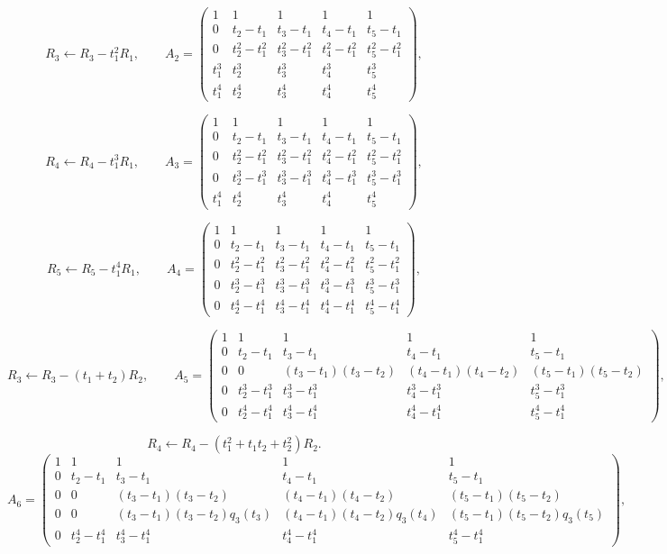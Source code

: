 \documentclass[10pt]{extarticle}
\begin{document}
\[
R_3\leftarrow R_3-t_1^2R_1,
\qquad
A_2=
\begin{pmatrix}
1 & 1 & 1 & 1 & 1\\
0 & t_2-t_1 & t_3-t_1 & t_4-t_1 & t_5-t_1\\
0 & t_2^2-t_1^2 & t_3^2-t_1^2 & t_4^2-t_1^2 & t_5^2-t_1^2\\
t_1^3 & t_2^3 & t_3^3 & t_4^3 & t_5^3\\
t_1^4 & t_2^4 & t_3^4 & t_4^4 & t_5^4
\end{pmatrix},
\]

\[
R_4\leftarrow R_4-t_1^3R_1,
\qquad
A_3=
\begin{pmatrix}
1 & 1 & 1 & 1 & 1\\
0 & t_2-t_1 & t_3-t_1 & t_4-t_1 & t_5-t_1\\
0 & t_2^2-t_1^2 & t_3^2-t_1^2 & t_4^2-t_1^2 & t_5^2-t_1^2\\
0 & t_2^3-t_1^3 & t_3^3-t_1^3 & t_4^3-t_1^3 & t_5^3-t_1^3\\
t_1^4 & t_2^4 & t_3^4 & t_4^4 & t_5^4
\end{pmatrix},
\]

\[
R_5\leftarrow R_5-t_1^4R_1,
\qquad
A_4=
\begin{pmatrix}
1 & 1 & 1 & 1 & 1\\
0 & t_2-t_1 & t_3-t_1 & t_4-t_1 & t_5-t_1\\
0 & t_2^2-t_1^2 & t_3^2-t_1^2 & t_4^2-t_1^2 & t_5^2-t_1^2\\
0 & t_2^3-t_1^3 & t_3^3-t_1^3 & t_4^3-t_1^3 & t_5^3-t_1^3\\
0 & t_2^4-t_1^4 & t_3^4-t_1^4 & t_4^4-t_1^4 & t_5^4-t_1^4
\end{pmatrix},
\]

\[
R_3\leftarrow R_3-(t_1+t_2)R_2,
\qquad
A_5=
\begin{pmatrix}
1 & 1 & 1 & 1 & 1\\
0 & t_2-t_1 & t_3-t_1 & t_4-t_1 & t_5-t_1\\
0 & 0 & (t_3-t_1)(t_3-t_2) & (t_4-t_1)(t_4-t_2) & (t_5-t_1)(t_5-t_2)\\
0 & t_2^3-t_1^3 & t_3^3-t_1^3 & t_4^3-t_1^3 & t_5^3-t_1^3\\
0 & t_2^4-t_1^4 & t_3^4-t_1^4 & t_4^4-t_1^4 & t_5^4-t_1^4
\end{pmatrix},
\]

\[
R_4\leftarrow R_4-(t_1^2+t_1t_2+t_2^2)R_2.
\]
\[
A_6=
\begin{pmatrix}
1 & 1 & 1 & 1 & 1\\
0 & t_2-t_1 & t_3-t_1 & t_4-t_1 & t_5-t_1\\
0 & 0 & (t_3-t_1)(t_3-t_2) & (t_4-t_1)(t_4-t_2) & (t_5-t_1)(t_5-t_2)\\
0 & 0 & (t_3-t_1)(t_3-t_2)q_3(t_3) & (t_4-t_1)(t_4-t_2)q_3(t_4) & (t_5-t_1)(t_5-t_2)q_3(t_5)\\
0 & t_2^4-t_1^4 & t_3^4-t_1^4 & t_4^4-t_1^4 & t_5^4-t_1^4
\end{pmatrix},
\]
\end{document}
